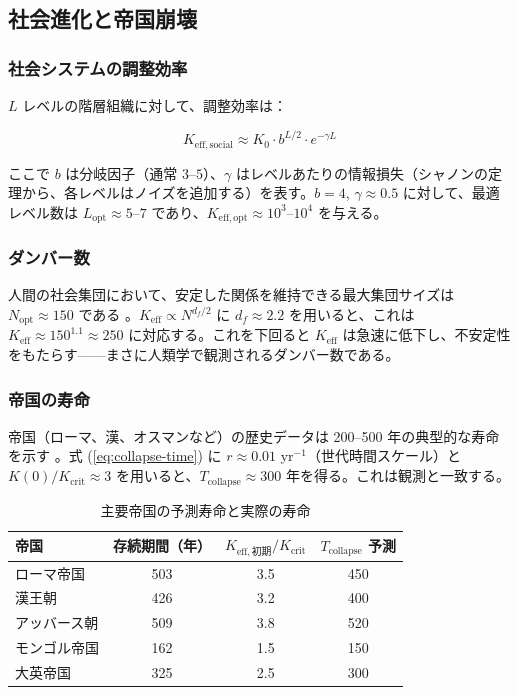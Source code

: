 \documentclass[12pt,a4paper]{article}
\newcommand{\Keff}{K_{\mathrm{eff}}}
\newcommand{\Keffcrit}{K_{\mathrm{crit}}}
\newcommand{\df}{d_{\!f}}
\theoremstyle{remark}
\begin{document}
	\subsection{社会進化と帝国崩壊}
	\label{subsec:social}
	
	\subsubsection{社会システムの調整効率}
	
	\(L\) レベルの階層組織に対して、調整効率は：
	
	\begin{equation}
		K_{\mathrm{eff},\text{social}} \approx K_0 \cdot b^{L/2} \cdot e^{-\gamma L}
		\label{eq:social-keff}
	\end{equation}
	
	ここで \(b\) は分岐因子（通常 \(3\)--\(5\)）、\(\gamma\) はレベルあたりの情報損失（シャノンの定理から、各レベルはノイズを追加する）を表す。\(b=4\), \(\gamma \approx 0.5\) に対して、最適レベル数は \(L_{\text{opt}} \approx 5\)--\(7\) であり、\(K_{\mathrm{eff},\text{opt}} \approx 10^3\)--\(10^4\) を与える。
	
	\subsubsection{ダンバー数}
	
	人間の社会集団において、安定した関係を維持できる最大集団サイズは \(N_{\text{opt}} \approx 150\) である \cite{Dunbar1992}。\(\Keff \propto N^{\df/2}\) に \(\df \approx 2.2\) を用いると、これは \(\Keff \approx 150^{1.1} \approx 250\) に対応する。これを下回ると \(\Keff\) は急速に低下し、不安定性をもたらす——まさに人類学で観測されるダンバー数である。
	
	\subsubsection{帝国の寿命}
	
	帝国（ローマ、漢、オスマンなど）の歴史データは 200--500 年の典型的な寿命を示す \cite{TurchinNefedov2009}。式 (\ref{eq:collapse-time}) に \(r \approx 0.01\) yr$^{-1}$（世代時間スケール）と \(K(0)/\Keffcrit \approx 3\) を用いると、\(T_{\text{collapse}} \approx 300\) 年を得る。これは観測と一致する。
	
	\begin{table}[htbp]
		\centering
		\caption{主要帝国の予測寿命と実際の寿命 \cite{TurchinNefedov2009}}
		\label{tab:empires}
		\small
		\begin{tabular}{lccc}
			\toprule
			\textbf{帝国} & \textbf{存続期間（年）} & $K_{\mathrm{eff},\text{初期}}/\Keffcrit$ & $T_{\text{collapse}}$ 予測 \\
			\midrule
			ローマ帝国 & 503 & 3.5 & 450 \\
			漢王朝 & 426 & 3.2 & 400 \\
			アッバース朝 & 509 & 3.8 & 520 \\
			モンゴル帝国 & 162 & 1.5 & 150 \\
			大英帝国 & 325 & 2.5 & 300 \\
			\bottomrule
		\end{tabular}
	\end{table}
	
\end{document}
